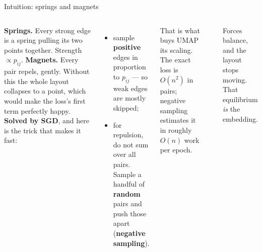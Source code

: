\documentclass[aspectratio=169]{beamer}
\begin{document}
\begin{frame}{Intuition: springs and magnets}
  \begin{columns}[T]
    \textbf{Springs.} Every strong edge is a spring pulling its two points together. Strength
    $\propto p_{ij}$.
    \vskip 4pt
    \textbf{Magnets.} Every pair repels, gently. Without this the whole layout collapses to a
    point, which would make the loss's first term perfectly happy.
    \vskip 6pt
    \textbf{Solved by SGD}, and here is the trick that makes it fast:
    \begin{itemize}\small
      \item sample \textbf{positive} edges in proportion to $p_{ij}$ --- so weak edges are
        mostly skipped;
      \item for repulsion, do not sum over all pairs. Sample a handful of \textbf{random}
        pairs and push those apart (\textbf{negative sampling}).
    \end{itemize}
    \vskip 4pt
    \footnotesize That is what buys UMAP its scaling. The exact loss is $O(n^2)$ in pairs;
    negative sampling estimates it in roughly $O(n)$ work per epoch.
    \begin{center}
    \end{center}
    \vskip 8pt
    {\footnotesize Forces balance, and the layout stops moving. That equilibrium \emph{is} the
    embedding.}
  \end{columns}
\end{frame}
\end{document}
